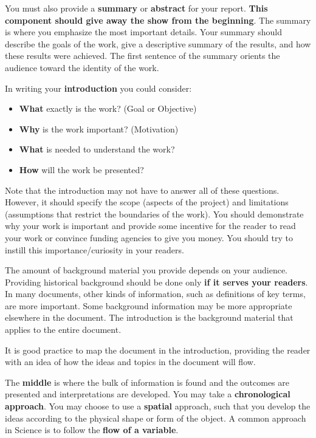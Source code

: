 You must also provide a \textbf{summary} or \textbf{abstract} for your report. \textbf{This component should give away the show from the beginning}. The summary is where you emphasize the most important details. Your summary should describe the goals of the work, give a descriptive summary of the results, and how these results were achieved. The first sentence of the summary orients the audience toward the identity of the work.

In writing your \textbf{introduction} you could consider:
\begin{itemize}
    \item \textbf{What} exactly is the work? (Goal or Objective)
    \item \textbf{Why} is the work important? (Motivation)
    \item \textbf{What} is needed to understand the work?
    \item \textbf{How} will the work be presented?
\end{itemize}

Note that the introduction may not have to answer all of these questions. However, it should specify the scope (aspects of the project) and limitations (assumptions that restrict the boundaries of the work). You should demonstrate why your work is important and provide some incentive for the reader to read your work or convince funding agencies to give you money. You should try to instill this importance/curiosity in your readers. 

The amount of background material you provide depends on your audience. Providing historical background should be done only \textbf{if it serves your readers}. In many documents, other kinds of information, such as definitions of key terms, are more important. Some background information may be more appropriate elsewhere in the document. The introduction is the background material that applies to the entire document.

It is good practice to map the document in the introduction, providing the reader with an idea of how the ideas and topics in the document will flow.


The \textbf{middle} is where the bulk of information is found and the outcomes are presented and interpretations are developed. You may take a \textbf{chronological approach}. You may choose to use a \textbf{spatial} approach, such that you develop the ideas according to the physical shape or form of the object. A common approach in Science is to follow the \textbf{flow of a variable}. 

